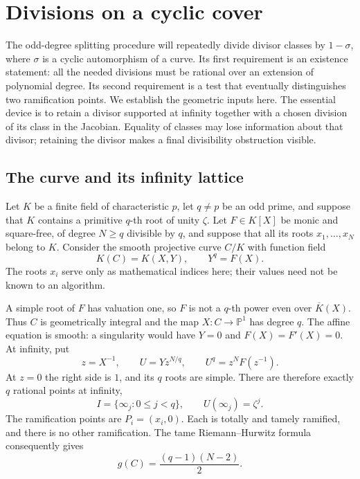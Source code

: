 \section{Divisions on a cyclic cover}
\label{geom:section}

The odd-degree splitting procedure will repeatedly divide divisor classes by
$1-\sigma$, where $\sigma$ is a cyclic automorphism of a curve.
Its first requirement is an existence statement:
all the needed divisions must be rational over an extension of polynomial
degree.  Its second requirement is a test that eventually distinguishes two
ramification points.  We establish the geometric inputs here.
The essential device is
to retain a divisor supported at infinity together with a chosen division
of its class in the Jacobian.  Equality of classes may lose information about that divisor;
retaining the divisor makes a final divisibility obstruction visible.

\subsection{The curve and its infinity lattice}
\label{geom:setup}

Let $K$ be a finite field of characteristic $p$, let $q\ne p$ be an odd
prime, and suppose that $K$ contains a primitive $q$-th root of unity $\zeta$.
Let $F\in K[X]$ be monic and square-free, of degree $N\ge q$ divisible by $q$,
and suppose that all its roots $x_1,\ldots,x_N$ belong to $K$.
Consider the smooth projective curve $C/K$ with function field
\[
                  K(C)=K(X,Y),\qquad Y^q=F(X).
\]
The roots $x_i$ serve only as mathematical indices here; their values need
not be known to an algorithm.

A simple root of $F$ has valuation one, so $F$ is not a $q$-th power even
over $\overline K(X)$.  Thus $C$ is geometrically integral and the map
$X:C\longrightarrow\mathbb P^1$ has degree $q$.  The affine equation is
smooth: a singularity would have $Y=0$ and $F(X)=F'(X)=0$.
At infinity, put
\[
 z=X^{-1},\qquad U=Yz^{N/q},\qquad
 U^q=z^N F(z^{-1}).
\]
At $z=0$ the right side is $1$, and its $q$ roots are simple.
There are therefore exactly $q$ rational points at infinity,
\[
 I=\{\infty_j:0\le j<q\},\qquad U(\infty_j)=\zeta^j.
\]
The ramification points are $P_i=(x_i,0)$.  Each is totally and tamely
ramified, and there is no other ramification.  The tame Riemann--Hurwitz
formula~\cite[Tags 0C1B and 0C1F]{StacksProject} consequently gives
\begin{equation}
                  g(C)=\frac{(q-1)(N-2)}2.
\label{geom:genus}
\end{equation}

